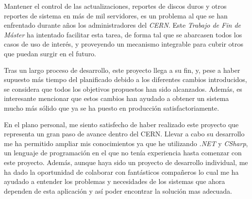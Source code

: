 
    Mantener el control de las actualizaciones, reportes de discos duros y otros reportes de sistema en más de mil servidores, es un problema al que se han enfrentado durante años los administradores del \textit{CERN}. Este \textit{Trabajo de Fin de Máster} ha intentado facilitar esta tarea, de forma tal que se abarcasen todos los casos de uso de interés, y proveyendo un mecanismo integrable para cubrir otros que puedan surgir en el futuro.
    
    Tras un largo proceso de desarrollo, este proyecto llega a su fin, y, pese a haber supuesto más tiempo del planificado debido a los diferentes cambios introducidos, se considera que todos los objetivos propuestos han sido alcanzados. Además, es interesante mencionar que estos cambios han ayudado a obtener un sistema mucho más sólido que ya se ha puesto en producción satisfactoriamente.
    
    En el plano personal, me siento satisfecho de haber realizado este proyecto que representa un gran paso de avance dentro del CERN. Llevar a cabo su desarrollo me ha permitido ampliar mis conocimientos ya que he utilizando \textit{.NET} y \textit{CSharp}, un lenguaje de programación en el que no tenía experiencia  hasta comenzar con este proyecto. Además, aunque haya sido un proyecto de desarrollo individual, me ha dado la oportunidad de colaborar con fantásticos compañeros lo cual me ha ayudado a entender los problemas y necesidades de los sistemas que ahora dependen de esta aplicación y así poder encontrar la solución mas adecuada.
